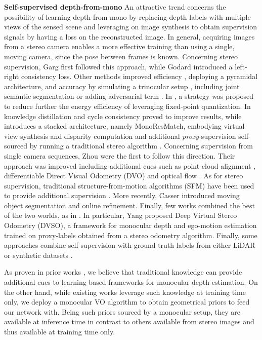 \documentclass[10pt,twocolumn,letterpaper]{article}
\begin{document}
\textbf{Self-supervised depth-from-mono}
An attractive trend concerns the possibility of learning depth-from-mono by replacing depth labels with multiple views of the sensed scene and leveraging on image synthesis to obtain supervision signals by having a loss on the reconstructed image.
In general, acquiring images from a stereo camera enables a more effective training than using a single, moving camera, since the pose between frames is known.
Concerning stereo supervision, Garg \etal \cite{Garg} first followed this approach, while Godard \etal \cite{Godard1} introduced a left-right consistency loss. Other methods improved efficiency \cite{pydnet18}, deploying a pyramidal architecture, and accuracy by simulating a trinocular setup \cite{3net18}, including joint semantic segmentation \cite{ramirez2018} or adding adversarial term \cite{Aleotti_monogan_2018,kumar2018gan}. In \cite{DATE_2019}, a strategy was proposed to reduce further the energy efficiency of \cite{pydnet18} leveraging fixed-point quantization. 
In \cite{Pilzer_2019_CVPR} knowledge distillation and cycle consistency proved to improve results, while \cite{Tosi_2019_CVPR} introduces a stacked architecture, namely MonoResMatch, embodying virtual view synthesis and disparity computation and additional \textit{proxy}-supervision self-sourced by running a traditional stereo algorithm \cite{hirschmuller2008stereo}.
Concerning supervision from single camera sequences, Zhou \etal \cite{Zhou_2017_CVPR} were the first to follow this direction. Their approach was improved including additional cues such as point-cloud alignment \cite{Mahjourian_2018_CVPR}, differentiable Direct Visual Odometry (DVO) \cite{Wang_2018_CVPR} and optical flow \cite{zou2018dfnet,Yin_2018_CVPR}. As for stereo supervision, traditional structure-from-motion algorithms (SFM) have been used to provide additional supervision \cite{Klodt_2018_ECCV}. More recently, Casser \etal \cite{casser2019struct2depth} introduced moving object segmentation and online refinement.
Finally, few works combined the best of the two worlds, as in \cite{Zhan_2018_CVPR}. In particular, Yang \etal \cite{yang2018deep} proposed Deep Virtual Stereo Odometry (DVSO), a framework for monocular depth and ego-motion estimation trained on proxy-labels obtained from a stereo odometry algorithm.
Finally, some approaches combine self-supervision with ground-truth labels from either LiDAR \cite{Kuznietsov} or synthetic datasets \cite{luo2018supervised,guo2018learning,atapour2018real}.

As proven in prior works \cite{Tosi_2019_CVPR,Klodt_2018_ECCV,yang2018deep}, we believe that traditional knowledge can provide additional cues to learning-based frameworks for monocular depth estimation. On the other hand, while existing works leverage such knowledge at training time only, we deploy a monocular VO algorithm to obtain geometrical priors to feed our network with. Being such priors sourced by a monocular setup, they are available at inference time in contrast to others available from stereo images  \cite{Tosi_2019_CVPR,yang2018deep} and thus available at training time only.
\end{document}
